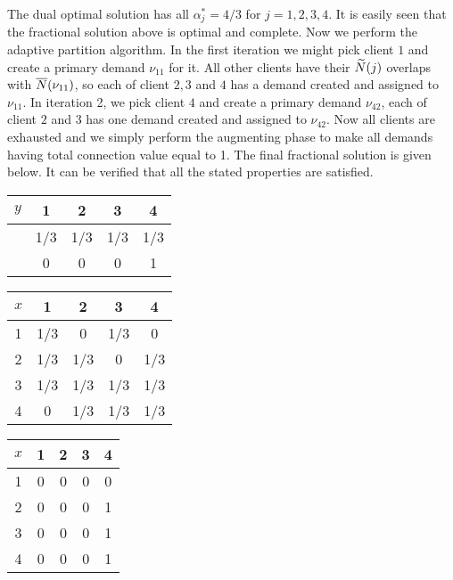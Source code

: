 \documentclass{article}
\begin{document}
The dual optimal solution has all $\alpha_j^\ast = 4/3$ for
$j=1,2,3,4$. It is easily seen that the fractional solution above is
optimal and complete. Now we perform the adaptive partition
algorithm. In the first iteration we might pick client $1$ and create
a primary demand $\nu_{11}$ for it. All other clients have their
${\widetilde N}(j)$ overlaps with ${\overline{N}}(\nu_{11})$, so each of client
$2,3$ and $4$ has a demand created and assigned to $\nu_{11}$. In
iteration 2, we pick client $4$ and create a primary demand
$\nu_{42}$, each of client $2$ and $3$ has one demand created and
assigned to $\nu_{42}$. Now all clients are exhausted and we simply
perform the augmenting phase to make all demands having total
connection value equal to 1. The final fractional solution is given
below. It can be verified that all the stated properties are
satisfied.
\begin{table}[ht,center]
  \begin{subtable}{0.3\textwidth}
  \centering
  \begin{tabular}{c | c c c c}
    $y$ & 1 & 2 & 3 & 4\\
    \hline
    & 1/3 & 1/3 & 1/3 & 1/3\\
    & 0 & 0 & 0 & 1\\
  \end{tabular}
\end{subtable}
%
\begin{subtable}{0.3\textwidth}
  \centering
  \begin{tabular}{c | c c c c}
    $x$ & 1 & 2 & 3 & 4\\
    \hline
    1 & 1/3 & 0   & 1/3 & 0\\
    2 & 1/3 & 1/3 & 0   & 1/3\\
    3 & 1/3 & 1/3 & 1/3 & 1/3\\
    4 & 0   & 1/3 & 1/3 & 1/3\\
  \end{tabular}
\end{subtable}
%
\begin{subtable}{0.3\textwidth}
  \centering
  \begin{tabular}{c | c c c c}
    $x$ & 1 & 2 & 3 & 4\\
    \hline
    1 & 0 & 0 & 0 & 0\\
    2 & 0 & 0 & 0 & 1\\
    3 & 0 & 0 & 0 & 1\\
    4 & 0 & 0 & 0 & 1\\
  \end{tabular}
\end{subtable}
\end{table}
\end{document}
